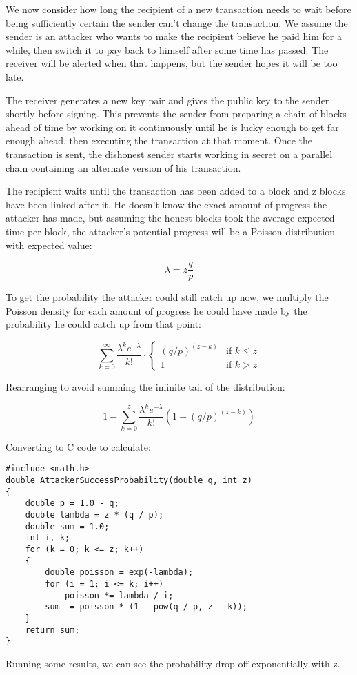 \documentclass{article}
\begin{document}
We now consider how long the recipient of a new transaction needs to wait before being sufficiently certain the sender can't change the transaction. We assume the sender is an attacker who wants to make the recipient believe he paid him for a while, then switch it to pay back to himself after some time has passed. The receiver will be alerted when that happens, but the sender hopes it will be too late.

The receiver generates a new key pair and gives the public key to the sender shortly before signing. This prevents the sender from preparing a chain of blocks ahead of time by working on it continuously until he is lucky enough to get far enough ahead, then executing the transaction at that moment. Once the transaction is sent, the dishonest sender starts working in secret on a parallel chain containing an alternate version of his transaction.

The recipient waits until the transaction has been added to a block and z blocks have been linked after it. He doesn't know the exact amount of progress the attacker has made, but assuming the honest blocks took the average expected time per block, the attacker's potential progress will be a Poisson distribution with expected value:

\begin{equation}
\lambda = z \frac{q}{p}
\end{equation}

To get the probability the attacker could still catch up now, we multiply the Poisson density for each amount of progress he could have made by the probability he could catch up from that point:

\begin{equation}
\sum_{k=0}^{\infty} \frac{\lambda^k e^{-\lambda}}{k!} \cdot
\begin{cases}
(q/p)^{(z-k)} & \text{if } k \leq z \\
1 & \text{if } k > z
\end{cases}
\end{equation}

Rearranging to avoid summing the infinite tail of the distribution:

\begin{equation}
1 - \sum_{k=0}^{z} \frac{\lambda^k e^{-\lambda}}{k!} \left(1-(q/p)^{(z-k)}\right)
\end{equation}

Converting to C code to calculate:

\begin{verbatim}
#include <math.h>
double AttackerSuccessProbability(double q, int z)
{
    double p = 1.0 - q;
    double lambda = z * (q / p);
    double sum = 1.0;
    int i, k;
    for (k = 0; k <= z; k++)
    {
        double poisson = exp(-lambda);
        for (i = 1; i <= k; i++)
            poisson *= lambda / i;
        sum -= poisson * (1 - pow(q / p, z - k));
    }
    return sum;
}
\end{verbatim}

Running some results, we can see the probability drop off exponentially with z.
\end{document}
